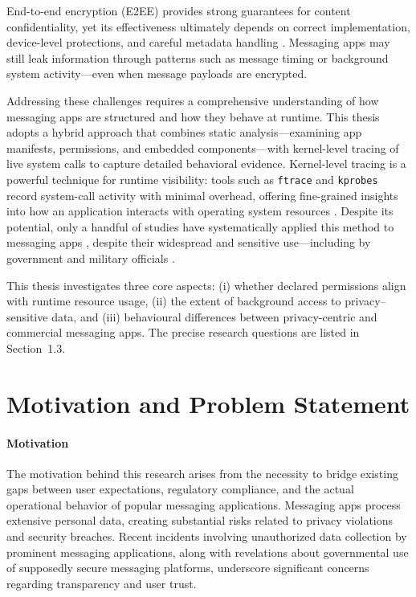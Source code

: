 \documentclass[a4paper,12pt]{report}
\begin{document}
End-to-end encryption (E2EE) provides strong guarantees for content
confidentiality, yet its effectiveness ultimately depends on correct
implementation, device-level protections, and careful metadata handling
\cite{arxiv2020metadata,wired2023signalhack}. Messaging apps may still leak
information through patterns such as message timing or background system
activity—even when message payloads are encrypted.

Addressing these challenges requires a comprehensive understanding of how messaging
apps are structured and how they behave at runtime. This thesis adopts a hybrid
approach that combines static analysis—examining app manifests, permissions,
and embedded components—with kernel-level tracing of live system calls to
capture detailed behavioral evidence. Kernel-level tracing is a powerful
technique for runtime visibility: tools such as \texttt{ftrace} and \texttt{kprobes}
record system-call activity with minimal overhead, offering fine-grained insights
into how an application interacts with operating system resources
\cite{BPFroid2021,AOSP2024Ftrace}. Despite its potential, only a handful of
studies have systematically applied this method to messaging apps
\cite{SLR2025Messaging}, despite their widespread and sensitive use—including
by government and military officials \cite{Politico2025Signal}.

This thesis investigates three core aspects:
(i) whether declared permissions align with runtime resource usage,
(ii) the extent of background access to privacy–sensitive data, and
(iii) behavioural differences between privacy-centric and commercial messaging apps.
The precise research questions are listed in Section~1.3.

\section{Motivation and Problem Statement}

\paragraph{Motivation}
The motivation behind this research arises from the necessity to bridge existing
gaps between user expectations, regulatory compliance, and the actual operational
behavior of popular messaging applications. Messaging apps process extensive personal
data, creating substantial risks related to privacy violations and security breaches.
Recent incidents involving unauthorized data collection by prominent messaging
applications, along with revelations about governmental use of supposedly secure
messaging platforms, underscore significant concerns regarding transparency
and user trust.
\end{document}
